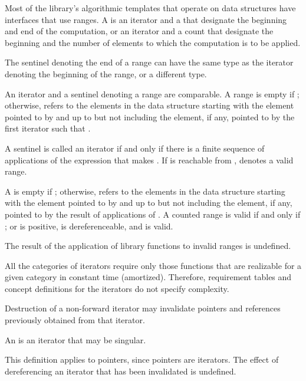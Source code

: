 \pnum
Most of the library's algorithmic templates that operate on data structures have
interfaces that use ranges. A  is an iterator and a 
that designate the beginning and end of the computation, or an iterator and a
count that designate the beginning and the number of elements to which the
computation is to be applied.
\begin{footnote}
The sentinel denoting the end of a range
can have the same type as the iterator denoting the beginning of the range, or a
different type.
\end{footnote}

\pnum
An iterator and a sentinel denoting a range are comparable.
A range 
is empty if ;
otherwise, 
refers to the elements in the data structure starting with the element
pointed to by
and up to but not including the element, if any, pointed to by
the first iterator  such that .

\pnum
A sentinel  is called  an iterator  if
and only if there is a finite sequence of applications of the expression
 that makes . If  is reachable from ,
 denotes a valid range.

\pnum
A   is empty if ;
otherwise,  refers to
the  elements in the data structure
starting with the element pointed to by  and up to but not including
the element, if any, pointed to by
the result of  applications of .
A counted range  is valid if and only if ;
or  is positive,  is dereferenceable,
and  is valid.

\pnum
The result of the application of library functions
to invalid ranges is undefined.

\pnum
All the categories of iterators require only those functions that are realizable for a given category in
constant time (amortized).
Therefore, requirement tables and concept definitions for the iterators
do not specify complexity.

\pnum
Destruction of a non-forward iterator may invalidate pointers and references
previously obtained from that iterator.

\pnum
An 
is an iterator that may be singular.
\begin{footnote}
This definition applies to pointers, since pointers are iterators.
The effect of dereferencing an iterator that has been invalidated
is undefined.
\end{footnote}

